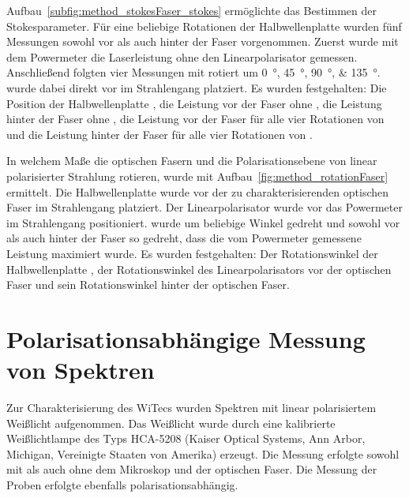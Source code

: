 \documentclass[a4paper,12pt,twoside,parskip=no,headsepline,open=right,ngerman,export]{scrreprt}
\begin{document}
            Aufbau~\ref{subfig:method_stokesFaser_stokes} ermöglichte das Bestimmen der Stokesparameter. Für eine beliebige Rotationen der Halbwellenplatte  wurden fünf Messungen sowohl vor als auch hinter der Faser vorgenommen. Zuerst wurde mit dem Powermeter  die Laserleistung ohne den Linearpolarisator  gemessen. Anschließend folgten vier Messungen mit  rotiert um \SIlist{0; 45; 90; 135}{\degree}.  wurde dabei direkt vor  im Strahlengang platziert. Es wurden festgehalten: Die Position der Halbwellenplatte , die Leistung vor der Faser ohne , die Leistung hinter der Faser ohne , die Leistung vor der Faser für alle vier Rotationen von  und die Leistung hinter der Faser für alle vier Rotationen von .
            
            In welchem Maße die optischen Fasern  und  die Polarisationsebene von linear polarisierter Strahlung rotieren, wurde mit Aufbau~\ref{fig:method_rotationFaser} ermittelt. Die Halbwellenplatte  wurde vor der zu charakterisierenden optischen Faser im Strahlengang platziert. Der Linearpolarisator  wurde vor das Powermeter im Strahlengang positioniert.  wurde um beliebige Winkel gedreht und  sowohl vor als auch hinter der Faser so gedreht, dass die vom Powermeter gemessene Leistung maximiert wurde. Es wurden festgehalten: Der Rotationswinkel der Halbwellenplatte , der Rotationswinkel des Linearpolarisators  vor der optischen Faser und sein Rotationswinkel hinter der optischen Faser.
            
        
        \section{Polarisationsabhängige Messung von Spektren}\label{sec:appendix_method_spectra}
        
            Zur Charakterisierung des WiTecs wurden Spektren mit linear polarisiertem Weißlicht aufgenommen. Das Weißlicht wurde durch eine kalibrierte Weißlichtlampe des Typs HCA-5208 (Kaiser Optical Systems, Ann Arbor, Michigan, Vereinigte Staaten von Amerika) erzeugt. Die Messung erfolgte sowohl mit als auch ohne dem Mikroskop und der optischen Faser. Die Messung der Proben erfolgte ebenfalls polarisationsabhängig.
            
\end{document}
